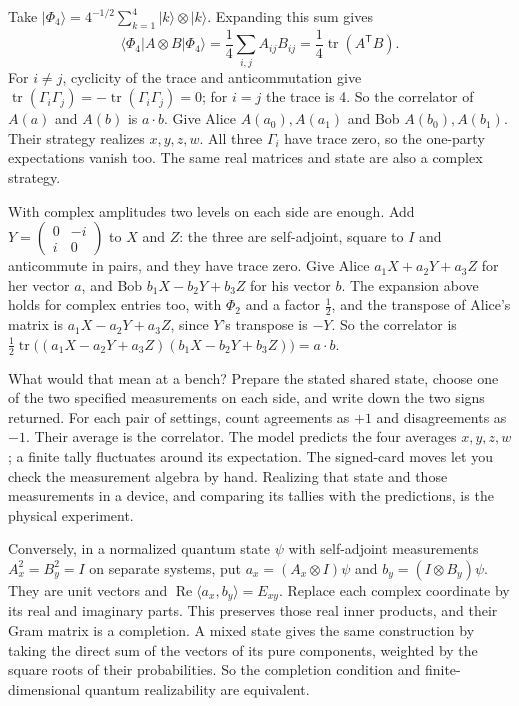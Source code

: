 \documentclass[11pt,twoside]{article}
\theoremstyle{thielethm}
\theoremstyle{thieledef}
\theoremstyle{thieledef}
\theoremstyle{thieledef}
\theoremstyle{thielethm}
\theoremstyle{thieleobs}
\theoremstyle{thielethm}
\begin{document}
Take
$\lvert\Phi_4\rangle=4^{-1/2}\sum_{k=1}^{4}\lvert k\rangle\otimes\lvert k\rangle$.
Expanding this sum gives
\[
\langle\Phi_4\rvert A\otimes B\lvert\Phi_4\rangle
=\frac14\sum_{i,j}A_{ij}B_{ij}=\frac14\operatorname{tr}(A^{\mathsf T}B).
\]
For $i\ne j$, cyclicity of the trace and anticommutation give
$\operatorname{tr}(\Gamma_i\Gamma_j)=-\operatorname{tr}(\Gamma_i\Gamma_j)=0$;
for $i=j$ the trace is 4. So the correlator of $A(a)$ and $A(b)$ is
$a\cdot b$. Give Alice $A(a_0),A(a_1)$ and Bob $A(b_0),A(b_1)$.
Their strategy realizes $x,y,z,w$. All three $\Gamma_i$ have trace zero, so the
one-party expectations vanish too. The same real matrices and state are also a
complex strategy.

With complex amplitudes two levels on each side are enough. Add
$Y=\begin{pmatrix}0&-i\\ i&0\end{pmatrix}$ to $X$ and $Z$: the three are self-adjoint, square
to $I$ and anticommute in pairs, and they have trace zero. Give Alice
$a_1X+a_2Y+a_3Z$ for her vector $a$, and Bob $b_1X-b_2Y+b_3Z$ for his vector $b$. The expansion
above holds for complex entries too, with $\Phi_2$ and a factor $\frac12$, and the transpose of
Alice's matrix is $a_1X-a_2Y+a_3Z$, since $Y$'s transpose is $-Y$. So the correlator is
$\frac12\operatorname{tr}\bigl((a_1X-a_2Y+a_3Z)(b_1X-b_2Y+b_3Z)\bigr)=a\cdot b$.

What would that mean at a bench? Prepare the stated shared state, choose one of
the two specified measurements on each side, and write down the two signs returned.
For each pair of settings, count agreements as $+1$ and disagreements as $-1$.
Their average is the correlator. The model predicts the four averages $x,y,z,w$;
a finite tally fluctuates around its expectation. The signed-card moves let you
check the measurement algebra by hand. Realizing that state and those measurements
in a device, and comparing its tallies with the predictions, is the physical experiment.

Conversely, in a normalized quantum state $\psi$ with self-adjoint measurements
$A_x^2=B_y^2=I$ on separate systems, put
$a_x=(A_x\otimes I)\psi$ and $b_y=(I\otimes B_y)\psi$. They are unit vectors and
$\operatorname{Re}\langle a_x,b_y\rangle=E_{xy}$. Replace each complex coordinate by
its real and imaginary parts. This preserves those real inner products, and their
Gram matrix is a completion. A mixed state gives the same construction by taking
the direct sum of the vectors of its pure components, weighted by the square roots
of their probabilities. So the completion condition and finite-dimensional quantum
realizability are equivalent.
\end{document}
